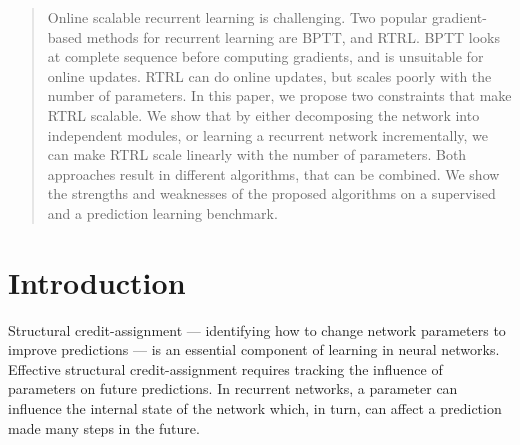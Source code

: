 \documentclass{article}
\newcommand{\algoname}{\text{Master-User}}
\newcommand{\archi}{\text{Col-NN}}
\begin{document}
\begin{abstract}

Online scalable recurrent learning is challenging. Two popular gradient-based methods for recurrent learning are BPTT, and RTRL. BPTT looks at complete sequence before computing gradients, and is unsuitable for online updates. RTRL can do online updates, but scales poorly with the number of parameters. In this paper, we propose two constraints that make RTRL scalable. We show that by either decomposing the network into independent modules, or learning a recurrent network incrementally, we can make RTRL scale linearly with the number of parameters. Both approaches result in different algorithms, that can be combined. We show the strengths and weaknesses of the proposed algorithms on a supervised and a prediction learning benchmark.
\end{abstract}

\section{Introduction}
Structural credit-assignment --- identifying how to change network parameters to improve predictions --- is an essential component of learning in neural networks. Effective structural credit-assignment requires tracking the influence of parameters on future predictions. In recurrent networks, a parameter can influence the internal state of the network which, in turn, can affect a prediction made many steps in the future.
\end{document}
